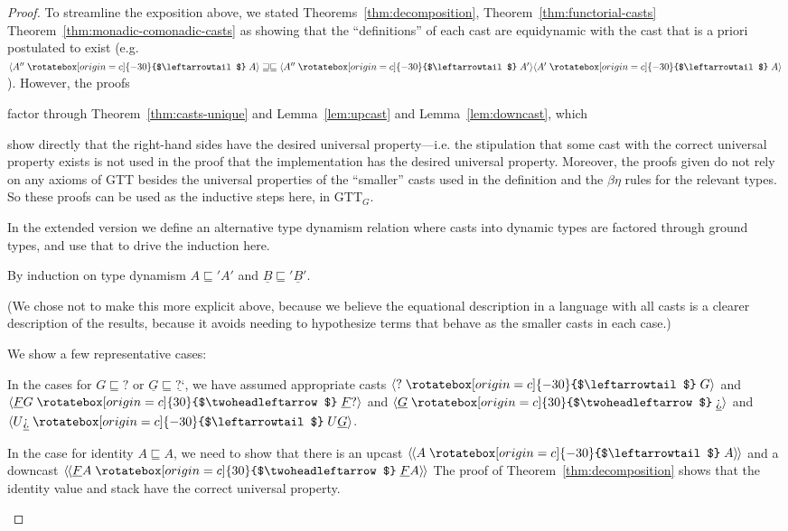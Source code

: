 \documentclass[acmsmall,screen,12pt]{acmart}
\renewcommand{\u}{\underline}
\newcommand{\ltdyn}{\sqsubseteq}
\newcommand{\gtdyn}{\sqsupseteq}
\newcommand{\equidyn}{\mathrel{\gtdyn\ltdyn}}
\newcommand{\dynv}{{?}}
\newcommand{\dync}{\u {\text{?`}}}
\newcommand{\uarrow}{\mathrel{\rotatebox[origin=c]{-30}{$\leftarrowtail$}}}
\newcommand{\darrow}{\mathrel{\rotatebox[origin=c]{30}{$\twoheadleftarrow$}}}
\newcommand{\upcast}[2]{\langle{#2}\uarrow{#1}\rangle}
\newcommand{\dncast}[2]{\langle{#1}\darrow{#2}\rangle}
\newcommand{\defupcast}[2]{\langle\kern-1ex~\langle{#2}\uarrow{#1}\rangle\kern-1ex~\rangle}
\newcommand{\defdncast}[2]{\langle\kern-1ex~\langle{#1}\darrow{#2}\rangle\kern-1ex~\rangle}
\begin{document}
\begin{proof}
  To streamline the exposition above, we stated
  Theorems~\ref{thm:decomposition}, Theorem~\ref{thm:functorial-casts}
  Theorem~\ref{thm:monadic-comonadic-casts} as showing that the
  ``definitions'' of each cast are equidynamic with the cast that is a
  priori postulated to exist (e.g. $\upcast{A}{A''} \equidyn
  \upcast{A'}{A''}{\upcast{A}{A'}}$).  However, the proofs
  \begin{longonly}
    factor
  through Theorem~\ref{thm:casts-unique} and Lemma~\ref{lem:upcast} and
  Lemma~\ref{lem:downcast}, which
  \end{longonly}
  show directly that the right-hand sides have the desired universal
  property---i.e. the stipulation that some cast with the correct
  universal property exists is not used in the proof that the
  implementation has the desired universal property.  Moreover, the
  proofs given do not rely on any axioms of GTT besides the universal
  properties of the ``smaller'' casts used in the definition and the
  $\beta\eta$ rules for the relevant types.  So these proofs can be used
  as the inductive steps here, in GTT$_G$.
  \begin{shortonly}
  In the extended version we define an alternative type dynamism
  relation where casts into dynamic types are factored through ground
  types, and use that to drive the induction here.  
  \end{shortonly}
  \begin{longonly}
  By induction on type dynamism $A \ltdyn' A'$ and $\u B \ltdyn' \u B'$.

  (We chose not to make this more explicit above, because we believe the
    equational description in a language with all casts is a clearer
    description of the results, because it avoids needing to hypothesize
    terms that behave as the smaller casts in each case.)

  We show a few representative cases:

  In the cases for $G \ltdyn \dynv$ or $\u G \ltdyn \dync$, we have
  assumed appropriate casts $\upcast{G}{\dynv}$ and 
  $\dncast{\u F G}{\u F \dynv}$ and 
  $\dncast{\u G}{\dync}$ and
  $\upcast{U \u G}{U \dync}$.
  
  In the case for identity $A \ltdyn A$, we need to show that there is
  an upcast $\defupcast{A}{A}$ and a downcast $\defdncast{\u F A}{\u F A}$
  The proof of Theorem~\ref{thm:decomposition} shows that the identity
  value and stack have the correct universal property.  


\end{longonly}
\end{proof}
\end{document}
